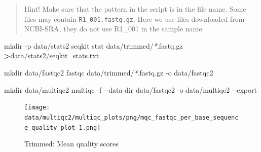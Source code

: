 \documentclass[
  12pt,
  openany]{book}
\newenvironment{Shaded}{\begin{snugshade}}{\end{snugshade}}
\newcommand{\AttributeTok}[1]{\textcolor[rgb]{0.77,0.63,0.00}{#1}}
\newcommand{\ControlFlowTok}[1]{\textcolor[rgb]{0.13,0.29,0.53}{\textbf{#1}}}
\newcommand{\DataTypeTok}[1]{\textcolor[rgb]{0.13,0.29,0.53}{#1}}
\newcommand{\ExtensionTok}[1]{#1}
\newcommand{\FunctionTok}[1]{\textcolor[rgb]{0.00,0.00,0.00}{#1}}
\newcommand{\KeywordTok}[1]{\textcolor[rgb]{0.13,0.29,0.53}{\textbf{#1}}}
\newcommand{\NormalTok}[1]{#1}
\newcommand{\OperatorTok}[1]{\textcolor[rgb]{0.81,0.36,0.00}{\textbf{#1}}}
\newcommand{\PreprocessorTok}[1]{\textcolor[rgb]{0.56,0.35,0.01}{\textit{#1}}}
\newcommand{\StringTok}[1]{\textcolor[rgb]{0.31,0.60,0.02}{#1}}
\newcommand{\VariableTok}[1]{\textcolor[rgb]{0.00,0.00,0.00}{#1}}
\begin{document}
\begin{quote}
Hint! Make sure that the pattern in the script is in the file name. Some files may contain \texttt{R1\_001.fastq.gz}. Here we use files downloaded from NCBI-SRA, they do not use R1\_001 in the sample name.
\end{quote}

\begin{Shaded}
\end{Shaded}

\begin{Shaded}
\begin{Highlighting}[]
\FunctionTok{mkdir} \AttributeTok{{-}p}\NormalTok{ data/stats2  }
\ExtensionTok{seqkit}\NormalTok{ stat data/trimmed/}\PreprocessorTok{*}\NormalTok{.fastq.gz }\OperatorTok{\textgreater{}}\NormalTok{data/stats2/seqkit\_stats.txt}

\FunctionTok{mkdir}\NormalTok{ data/fastqc2}
\ExtensionTok{fastqc}\NormalTok{ data/trimmed/}\PreprocessorTok{*}\NormalTok{.fastq.gz }\AttributeTok{{-}o}\NormalTok{ data/fastqc2}

\FunctionTok{mkdir}\NormalTok{ data/multiqc2}
\ExtensionTok{multiqc} \AttributeTok{{-}f} \AttributeTok{{-}{-}data{-}dir}\NormalTok{ data/fastqc2 }\AttributeTok{{-}o}\NormalTok{ data/multiqc2 }\AttributeTok{{-}{-}export}
\end{Highlighting}
\end{Shaded}

\begin{figure}
\centering
\texttt{[image: data/multiqc2/multiqc\_plots/png/mqc\_fastqc\_per\_base\_sequence\_quality\_plot\_1.png]}
\caption{Trimmed: Mean quality scores}
\end{figure}
\end{document}
